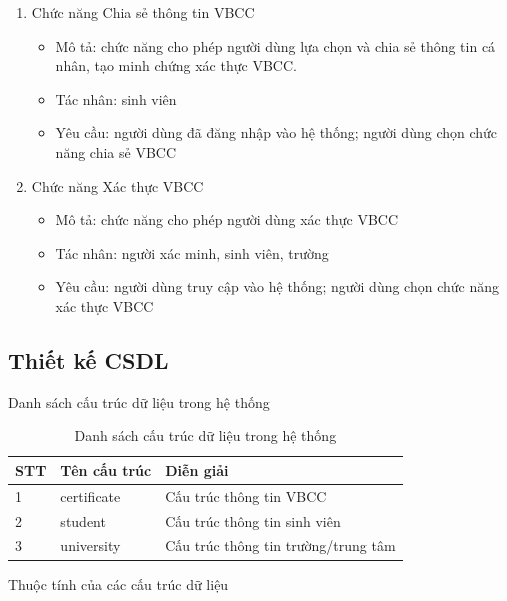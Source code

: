 \begin{enumerate}
\item 
Chức năng Chia sẻ thông tin VBCC
\begin{itemize}
\item Mô tả: chức năng cho phép người dùng lựa chọn và chia sẻ thông tin cá nhân, tạo minh chứng xác thực VBCC. 
\item Tác nhân: sinh viên 
\item Yêu cầu: người dùng đã đăng nhập vào hệ thống; người dùng chọn chức năng chia sẻ VBCC
\end{itemize}

\item 
Chức năng Xác thực VBCC
\begin{itemize}
\item Mô tả: chức năng cho phép người dùng xác thực VBCC
\item Tác nhân: người xác minh, sinh viên, trường 
\item Yêu cầu: người dùng truy cập vào hệ thống; người dùng chọn chức năng xác thực VBCC
\end{itemize}

\end{enumerate}

\subsection{Thiết kế CSDL}

Danh sách cấu trúc dữ liệu trong hệ thống


\begin{table}[H]
\caption{Danh sách cấu trúc dữ liệu trong hệ thống}
	\label{table:dataschema}
	\begin{tabularx} {\textwidth} {|p{1cm}|p{3cm}|X|}
\hline
		STT &	Tên cấu trúc & Diễn giải \\ \hline
		1 & certificate	& Cấu trúc thông tin VBCC\\ \hline
		2 & student & Cấu trúc thông tin sinh viên \\ \hline
		3 & university	&Cấu trúc thông tin trường/trung tâm \\ \hline
	\end{tabularx}
\end{table}

Thuộc tính của các cấu trúc dữ liệu

